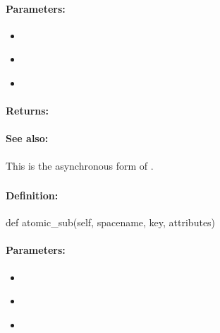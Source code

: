 \paragraph{Parameters:}
\begin{itemize}[noitemsep]
\item {}\\

\item {}\\

\item {}\\

\end{itemize}

\paragraph{Returns:}


\paragraph{See also:}  This is the asynchronous form of .

\pagebreak
\subsubsection{}
\label{api:python:atomic_sub}


\paragraph{Definition:}
\begin{pythoncode}
def atomic_sub(self, spacename, key, attributes)
\end{pythoncode}

\paragraph{Parameters:}
\begin{itemize}[noitemsep]
\item {}\\

\item {}\\

\item {}\\

\end{itemize}

